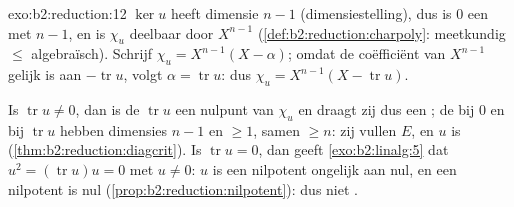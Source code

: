 \begin{solution}{exo:b2:reduction:12}
$\ker u$ heeft dimensie $n - 1$ (dimensiestelling), dus is $0$ een
 met  $n - 1$, en is $\chi_u$
deelbaar door $X^{n-1}$ (\cref{def:b2:reduction:charpoly}:
meetkundig $\leq$ algebraïsch). Schrijf $\chi_u = X^{n-1}(X -
\alpha)$; omdat de coëfficiënt van $X^{n-1}$ gelijk is aan
$-\operatorname{tr} u$, volgt $\alpha = \operatorname{tr} u$: dus
$\chi_u = X^{n-1}(X - \operatorname{tr} u)$.

Is $\operatorname{tr} u \neq 0$, dan is de 
$\operatorname{tr} u$ een nulpunt van $\chi_u$ en draagt zij dus
een ; de  bij $0$ en bij $\operatorname{tr}
u$ hebben dimensies $n - 1$ en $\geq 1$, samen $\geq n$: zij vullen
$E$, en $u$ is 
(\cref{thm:b2:reduction:diagcrit}). Is $\operatorname{tr} u = 0$,
dan geeft \cref{exo:b2:linalg:5} dat $u^2 = (\operatorname{tr}
u)u = 0$ met $u \neq 0$: $u$ is een nilpotent ongelijk aan nul, en
een  nilpotent is nul
(\cref{prop:b2:reduction:nilpotent}): dus niet .
\end{solution}

